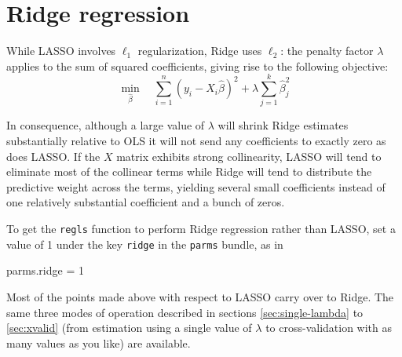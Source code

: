 \documentclass{article}
\begin{document}
\section{Ridge regression}
\label{sec:ridge}

While LASSO involves $\ell_1$ regularization, Ridge uses $\ell_2$: the
penalty factor $\lambda$ applies to the sum of squared coefficients,
giving rise to the following objective:
\begin{equation}
  \label{eq:ridge-obj}
  \min_{\hat{\beta}} \quad
  \sum_{i=1}^n (y_i - X_i\hat{\beta})^2 + \lambda \sum_{j=1}^k \hat{\beta}_j^2
\end{equation}

In consequence, although a large value of $\lambda$ will shrink Ridge
estimates substantially relative to OLS it will not send any
coefficients to exactly zero as does LASSO. If the $X$ matrix exhibits
strong collinearity, LASSO will tend to eliminate most of the
collinear terms while Ridge will tend to distribute the predictive
weight across the terms, yielding several small coefficients instead
of one relatively substantial coefficient and a bunch of zeros.

To get the \texttt{regls} function to perform Ridge regression rather
than LASSO, set a value of 1 under the key \texttt{ridge} in the
\texttt{parms} bundle, as in
\begin{code}
parms.ridge = 1
\end{code}

Most of the points made above with respect to LASSO carry over to
Ridge. The same three modes of operation described in sections
\ref{sec:single-lambda} to \ref{sec:xvalid} (from estimation using a
single value of $\lambda$ to cross-validation with as many values as
you like) are available.
\end{document}
